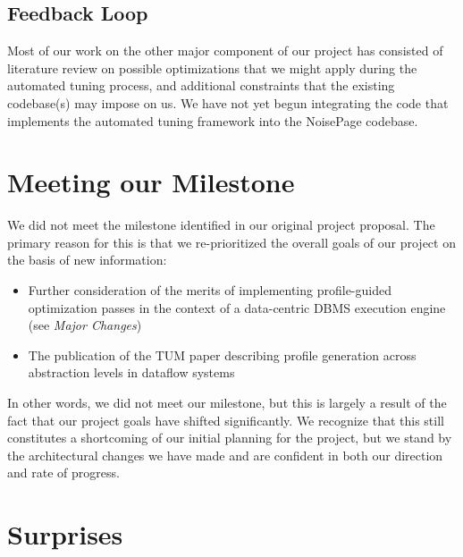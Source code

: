 \documentclass{vldb}
\begin{document}
\subsection{Feedback Loop}

Most of our work on the other major component of our project has consisted of literature review on possible optimizations that we might apply during the automated tuning process, and additional constraints that the existing codebase(s) may impose on us. We have not yet begun integrating the code that implements the automated tuning framework into the NoisePage codebase.


\section{Meeting our Milestone}

We did not meet the milestone identified in our original project proposal. The primary reason for this is that we re-prioritized the overall goals of our project on the basis of new information:

\begin{itemize}
    \item Further consideration of the merits of implementing profile-guided optimization passes in the context of a data-centric DBMS execution engine (see \textit{Major Changes})
    \item The publication of the TUM paper describing profile generation across abstraction levels in dataflow systems
\end{itemize}

In other words, we did not meet our milestone, but this is largely a result of the fact that our project goals have shifted significantly. We recognize that this still constitutes a shortcoming of our initial planning for the project, but we stand by the architectural changes we have made and are confident in both our direction and rate of progress.


\section{Surprises}
\end{document}
